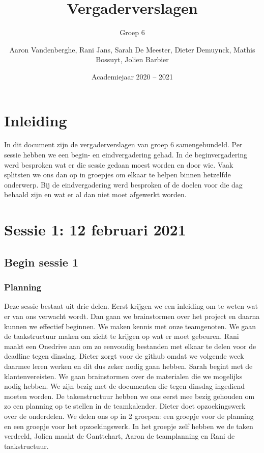 \documentclass[a4paper,twoside,kulak]{kulakreport} %
\title{Vergaderverslagen}
\subtitle{Groep 6}
\author{Aaron Vandenberghe, Rani Jans, Sarah De Meester, Dieter Demuynck, Mathis Bossuyt, Jolien Barbier}
\institute{KU Leuven Kulak, Wetenschap \& Technologie}
\date{Academiejaar 2020 -- 2021}
\begin{document}
 

\titlepage

\tableofcontents


\chapter*{Inleiding}
In dit document zijn de vergaderverslagen van groep 6 samengebundeld. Per sessie hebben we een begin- en eindvergadering
gehad. In de beginvergadering werd besproken wat er die sessie gedaan moest worden en door wie. Vaak splitsten we ons dan op in groepjes om elkaar te helpen binnen hetzelfde onderwerp. Bij de eindvergadering werd besproken of de doelen voor die dag behaald zijn en wat er al dan niet moet afgewerkt worden. 

\chapter{Sessie 1: 12 februari 2021}
\section{Begin sessie 1}
\subsection{Planning}
Deze sessie  bestaat uit drie delen. Eerst krijgen we een inleiding om te weten wat er van ons verwacht wordt. Dan gaan we brainstormen over het project en daarna kunnen we effectief beginnen. We maken kennis met onze teamgenoten. We gaan de taakstructuur maken om zicht te krijgen op wat er moet gebeuren. Rani maakt een Onedrive aan om zo eenvoudig bestanden met elkaar te delen voor de deadline tegen dinsdag. Dieter zorgt voor de github omdat we volgende week daarmee leren werken en dit dus zeker nodig gaan hebben. %
Sarah begint met de klantenvereisten. We gaan brainstormen over de materialen die we mogelijks nodig hebben. We zijn bezig met de documenten die tegen dinsdag ingediend moeten worden. De takenstructuur hebben we ons eerst mee bezig gehouden om zo een planning op te stellen in de teamkalender. %
Dieter doet opzoekingswerk over de onderdelen. We delen ons op in 2 groepen: een groepje voor de planning en een groepje voor het opzoekingswerk. In het groepje zelf hebben we de taken verdeeld, Jolien maakt de Ganttchart, Aaron de teamplanning en Rani de taakstructuur. 
\end{document}
